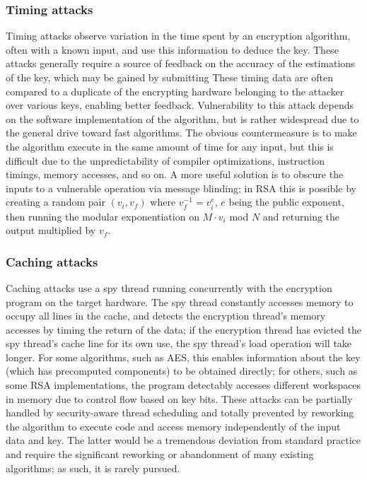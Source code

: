 \documentclass[times, 10pt,twocolumn]{article}
\begin{document}
\subsubsection{Timing attacks}
Timing attacks observe variation in the time spent by an encryption algorithm, often with a known input, and use this information to deduce the key.  These attacks generally require a source of feedback on the accuracy of the estimations of the key, which may be gained by submitting  These timing data are often compared to a duplicate of the encrypting hardware belonging to the attacker over various keys, enabling better feedback.  Vulnerability to this attack depends on the software implementation of the algorithm, but is rather widespread due to the general drive toward fast algorithms.  The obvious countermeasure is to make the algorithm execute in the same amount of time for any input, but this is difficult due to the unpredictability of compiler optimizations, instruction timings, memory accesses, and so on.  A more useful solution is to obscure the inputs to a vulnerable operation via message blinding\cite{mmthesis}; in RSA this is possible by creating a random pair $(v_{i},v_{f})$ where $v_{f}^{-1}=v_{i}^e$, $e$ being the public exponent, then running the modular exponentiation on $M\cdot v_{i}$ mod $N$ and returning the output multiplied by $v_{f}$\cite{Kocher96timingattacks}.

\subsubsection{Caching attacks}
Caching attacks use a spy thread running concurrently with the encryption program on the target hardware.  The spy thread constantly accesses memory to occupy all lines in the cache, and detects the encryption thread's memory accesses by timing the return of the data; if the encryption thread has evicted the spy thread's cache line for its own use, the spy thread's load operation will take longer.  For some algorithms, such as AES\cite{2004-bernstein-cachetiming}, this enables information about the key (which has precomputed components) to be obtained directly; for others, such as some RSA implementations\cite{Percival05cachemissing}, the program detectably accesses different workspaces in memory due to control flow based on key bits.  These attacks can be partially handled by security-aware thread scheduling and totally prevented by reworking the algorithm to execute code and access memory independently of the input data and key.  The latter would be a tremendous deviation from standard practice and require the significant reworking or abandonment of many existing algorithms\cite{Percival05cachemissing}; as such, it is rarely pursued.
\end{document}
